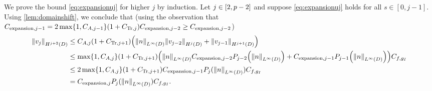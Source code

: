 We prove the bound \cref{eq:expansionuj} for higher $j$ by induction. Let $j \in \mleft[2,p-2\mright]$ and suppose \cref{eq:expansionuj} holds for all $s \in [0,j-1].$ Using \cref{lem:domainshift}, we conclude that (using the observation that $\Cefn{j-1} = 2\max\set{1,\CAjmo}\mleft(1+\CTrj\mright)\Cefn{j-2}\geq \Cefn{j-2}$)
\begin{align*}
\NHfn{j+2}{D}{\vj} &\leq \CAj \mleft(1+\CTrjpo\mright)\mleft(\NLiD{n} \NHfn{j}{D}{\vfn{j-2}} + \NHfn{j+1}{D}{\vfn{j-1}}\mright)\\
&\leq \max\set{1,\CAj} \mleft(1+\CTrjpo\mright)\mleft(\NLiD{n} \Cefn{j-2} \Pfn{j-2}\mleft(\NLiD{n}\mright) + \Cefn{j-1} \Pfn{j-1}\mleft(\NLiD{n}\mright)\mright)\Cfg\\
&\leq 2\max\set{1,\CAj} \mleft(1+\CTrjpo\mright)\Cefn{j-1} \Pfn{j}(\NLiD{n})\Cfg\\
&= \Cefn{j} \Pfn{j}(\NLiD{n})\Cfg.
\end{align*}

